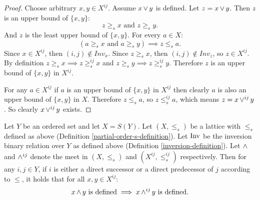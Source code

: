 	\begin{proof}
		Choose arbitrary $x, y \in X^{ij}$. Assume $x \operatorname{\vee} y$ is defined. Let $z = x \operatorname{\vee} y$. Then $z$ is an upper bound of $\{x, y\}$:
		\[
			z \ge_s x \textrm{ and } z \ge_s y.
		\]
		And $z$ is the least upper bound of $\{x, y\}$. For every $a \in X$:
		\[
			(a \ge_s x \textrm{ and } a \ge_s y) \implies z \le_s a.
		\]
		Since $x \in X^{ij}$, then $(i, j) \notin Inv_x$. Since $z \ge_s x$, then $(i, j) \notin Inv_z$, so $z \in X^{ij}$. By definition $z \ge_s x \implies z \ge^{ij}_s x$ and $z \ge_s y \implies z \ge^{ij}_s y$. Therefore $z$ is an upper bound of $\{x, y\}$ in $X^{ij}$.

		For any $a \in X^{ij}$ if $a$ is an upper bound of $\{x, y\}$ in $X^{ij}$ then clearly $a$ is also an upper bound of $\{x, y\}$ in $X$. Therefore $z \le_s a$, so $z \le^{ij}_s a$, which means $z = x \operatorname{\vee}^{ij} y$. So clearly $x \operatorname{\vee}^{ij} y$ exists.
	\end{proof}

	\begin{lemma}
		\label{identified-permutation-lattice-meet}
		Let $Y$ be an ordered set and let $X = S(Y)$. Let $(X, \le_s)$ be a lattice with $\le_s$ defined as above (Definition \ref{partial-order-s-definition}). Let $\operatorname{Inv}$ be the inversion binary relation over $Y$ as defined above (Definition \ref{inversion-definition}). Let $\operatorname{\wedge}$ and $\operatorname{\wedge}^{ij}$ denote the meet in $(X, \le_s)$ and $(X^{ij}, \le^{ij}_s)$ respectively. Then for any $i,j \in Y$, if $i$ is either a direct successor or a direct predecessor of $j$ according to $\le$, it holds that for all $x, y \in X^{ij}$:
		\[
			x \operatorname{\wedge} y \text{ is defined} \implies x \operatorname{\wedge}^{ij} y \text{ is defined}.
		\]
	\end{lemma}

